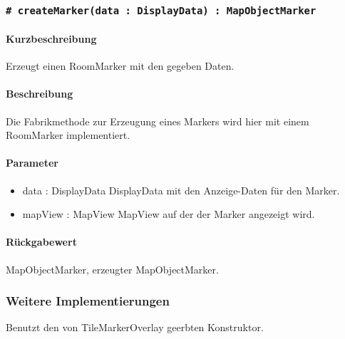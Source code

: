 \subsubsection*{\texttt{\# createMarker(data : DisplayData) : MapObjectMarker}}%
\paragraph*{Kurzbeschreibung}
Erzeugt einen RoomMarker mit den gegeben Daten.
\paragraph*{Beschreibung}
Die Fabrikmethode zur Erzeugung eines Markers wird hier mit einem RoomMarker implementiert.
\paragraph*{Parameter}
\begin{itemize}
    \item data : DisplayData DisplayData mit den Anzeige-Daten für den Marker.
    \item mapView : MapView MapView auf der der Marker angezeigt wird.
\end{itemize}
\paragraph*{Rückgabewert}
MapObjectMarker, erzeugter MapObjectMarker.

\subsubsection*{Weitere Implementierungen}%
Benutzt den von TileMarkerOverlay geerbten Konstruktor.